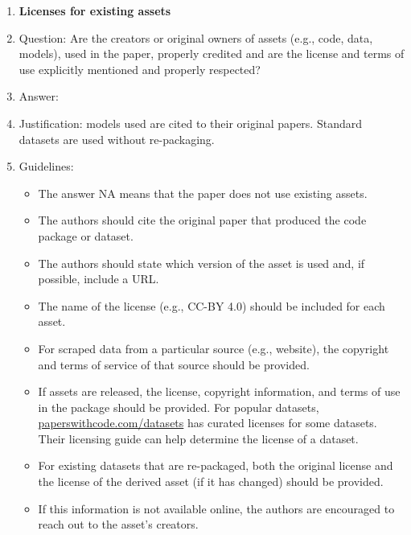 \documentclass{article}
\begin{document}
\begin{enumerate}
\item {\bf Licenses for existing assets}
    \item[] Question: Are the creators or original owners of assets (e.g., code, data, models), used in the paper, properly credited and are the license and terms of use explicitly mentioned and properly respected?
    \item[] Answer: \answerYes{} %
    \item[] Justification: models used are cited to their original papers. Standard datasets are used without re-packaging.
    \item[] Guidelines:
    \begin{itemize}
        \item The answer NA means that the paper does not use existing assets.
        \item The authors should cite the original paper that produced the code package or dataset.
        \item The authors should state which version of the asset is used and, if possible, include a URL.
        \item The name of the license (e.g., CC-BY 4.0) should be included for each asset.
        \item For scraped data from a particular source (e.g., website), the copyright and terms of service of that source should be provided.
        \item If assets are released, the license, copyright information, and terms of use in the package should be provided. For popular datasets, \url{paperswithcode.com/datasets} has curated licenses for some datasets. Their licensing guide can help determine the license of a dataset.
        \item For existing datasets that are re-packaged, both the original license and the license of the derived asset (if it has changed) should be provided.
        \item If this information is not available online, the authors are encouraged to reach out to the asset's creators.
    \end{itemize}


\end{enumerate}
\end{document}

